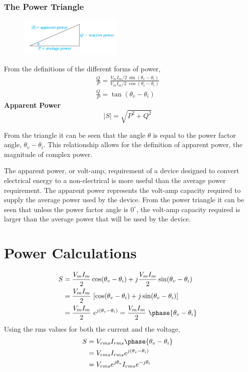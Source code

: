 \documentclass[12pt]{article}
\begin{document}
    \subsubsection*{The Power Triangle}
    \begin{figure}[h]
        \centering
        \includegraphics[width=0.45\textwidth]{Power Triangle.png}
    \end{figure}
    \noindent From the definitions of the different forms of power,
    \begin{gather*}
        \frac{Q}{P} = \frac{V_{m} I_{m} / 2\ \sin (\theta_{v} -
        \theta_{i})}{V_{m} I_{m} / 2\ \cos (\theta_{v} - \theta_{i})} \\
        \frac{Q}{P} = \tan (\theta_{v} - \theta_{i})
    \end{gather*}
    \textbf{Apparent Power}
    \[
        |S| = \sqrt{P^2+Q^2}
    \]
    \par From the triangle it can be seen that the angle $\theta$ is equal to
    the power factor angle, $\theta_{v} - \theta_{i}$. This relationship allows
    for the definition of apparent power, the magnitude of complex power.
    \par The apparent power, or volt-amp, requirement of a device designed to
    convert electrical energy to a non-electrical is more useful than the
    average power requirement. The apparent power represents the volt-amp
    capacity required to supply the average power used by the device. From the
    power triangle it can be seen that unless the power factor angle is
    $0^{\circ}$, the volt-amp capacity required is larger than the average power
    that will be used by the device.
    \section*{Power Calculations}
    \begin{align*}
        S &= \frac{V_{m} I_{m}}{2} \cos (\theta_{v} - \theta_{i}) + j \frac{V_{m}
          I_{m}}{2} \sin (\theta_{v} - \theta_{i}) \\
          &= \frac{V_{m} I_{m}}{2}\ [\cos (\theta_{v} - \theta_{i}) + j \sin
          (\theta_{v} - \theta_{i})] \\
          &= \frac{V_{m} I_{m}}{2}\ e^{j(\theta_{v} - \theta_{i})} = \frac{V_{m}
          I_{m}}{2}\ \phase{\theta_{v} - \theta_{i}}
    \end{align*}
    Using the rms values for both the current and the voltage,
    \begin{align*}
        S &= V_{rms} I_{rms} \phase{\theta_{v} - \theta_{i}} \\
          &= V_{rms} I_{rms} e^{j(\theta_{v} - \theta_{i})} \\
          &= V_{rms} e^{j \theta_{v}} I_{rms} e^{-j \theta_{i}}
    \end{align*}
\end{document}
